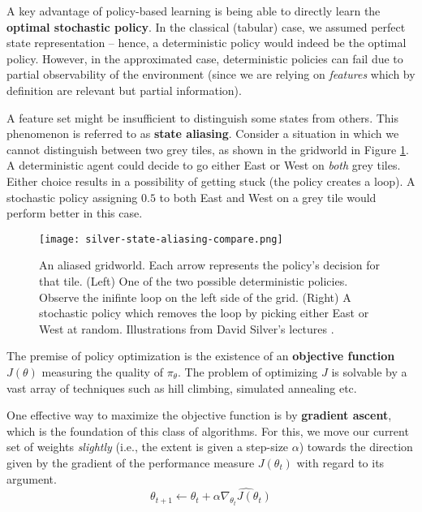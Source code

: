 A key advantage of policy-based learning is being able to directly learn the \textbf{optimal stochastic policy}.
In the classical (tabular) case, we assumed perfect state representation -- hence, a deterministic policy would indeed be the optimal policy.
However, in the approximated case, deterministic policies can fail due to partial observability of the environment (since we are relying on \emph{features} which by definition are relevant but partial information).

A feature set might be insufficient to distinguish some states from others. This phenomenon is referred to as \textbf{state aliasing}.
Consider a situation in which we cannot distinguish between two grey tiles, as shown in the gridworld in Figure \ref{fig:state-aliasing}.
A deterministic agent could decide to go either East or West on \emph{both} grey tiles.
Either choice results in a possibility of getting stuck (the policy creates a loop).
A stochastic policy assigning $0.5$ to both East and West on a grey tile would perform better in this case.

\begin{figure}[h]
    \centering
    \texttt{[image: silver-state-aliasing-compare.png]}
    \caption{
        An aliased gridworld. Each arrow represents the policy's decision for that tile.
        (Left) One of the two possible deterministic policies. Observe the inifinte loop on the left side of the grid.
        (Right) A stochastic policy which removes the loop by picking either East or West at random.
        Illustrations from David Silver's lectures \cite{silver-lectures}.
    }
    \label{fig:state-aliasing}
\end{figure}

The premise of policy optimization is the existence of an \textbf{objective function} $J(\theta)$ measuring the quality of $\pi_{\theta}$.
The problem of optimizing $J$ is solvable by a vast array of techniques such as hill climbing, simulated annealing etc.

One effective way to maximize the objective function is by \textbf{gradient ascent}, which is the foundation of this class of algorithms.
For this, we move our current set of weights \emph{slightly} (i.e., the extent is given a step-size $\alpha$) towards the direction given by the gradient of the performance measure $J(\theta_{t})$ with regard to its argument.
\begin{equation} \label{eqn:pg-general-rule}
    \theta_{t+1} \leftarrow \theta_{t} + \alpha \widehat{ \nabla_{\theta_{t}} J(\theta_{t}) }
\end{equation}

